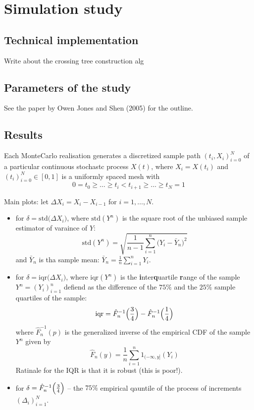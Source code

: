 \documentclass[a4paper]{report}
\begin{document}

\section{Simulation study} %
\label{sec:simulation_study}

\subsection{Technical implementation} %
\label{sub:technical_implementation}
Write about the crossing tree construction alg


\subsection{Parameters of the study} %
\label{sub:parameters_of_the_study}
See the paper by Owen Jones and Shen (2005) for the outline.


\subsection{Results} %
\label{sub:results}

Each MonteCarlo realisation generates a discretized sample path $(t_i, X_i)_{i=0}^N$ of
a particular continuous stochastc process $X(t)$, where $X_i = X(t_i)$ and $(t_i)_{i=0}^N\in [0,1]$
is a uniformly spaced mesh with
\[0 = t_0 \geq \ldots \geq t_i < t_{i+1} \geq \ldots \geq t_N = 1\]

Main plots: let $\Delta X_i = X_i - X_{i-1}$ for $i=1,\ldots, N$.
\begin{itemize}
	\item for $\delta = \text{std}\bigl(\Delta X_i \bigr)$, where $\text{std}(Y^n)$ is
	the square root of the unbiased sample estimator of varaince of $Y$:
	\[ \text{std}(Y^n) = \sqrt{ \frac{1}{n-1} \sum_{i=1}^n \bigl( Y_i - \bar{Y}_n \bigr)^2 }\]
	and $\bar{Y}_n$ is tha sample mean: $\bar{Y}_n = \frac{1}{n}\sum_{i=1}^n Y_i$. 

	\item for $\delta = \text{iqr}\bigl(\Delta X_i \bigr)$, where $\text{iqr}(Y^n)$ is
	the \textbf{i}nter\textbf{q}uartile \textbf{r}ange of the sample $Y^n = (Y_i)_{i=1}^n$
	defiend as the difference of the $75\%$ and the $25\%$ sample quartiles of the sample:
	\[\text{iqr} = \hat{F}^{-1}_n\Bigl(\frac{3}{4}\Bigr) - \hat{F}^{-1}_n\Bigl(\frac{1}{4}\Bigr)\]
	where $\hat{F}^{-1}_n(p)$ is the generalized inverse of the empirical CDF of the sample $Y^n$
	given by
	\[\hat{F}_n(y) = \frac{1}{n} \sum_{i=1}^n 1_{(-\infty,y]}(Y_i)\]
	Ratinale for the IQR is that it is robust (this is poor!).
	\item for $\delta = \hat{F}^{-1}_n\Bigl(\frac{3}{4}\Bigr)$ -- the $75\%$ empirical qauntile of
	the process of increments $(\Delta_i)_{i=1}^N$.
\end{itemize}
\end{document}
